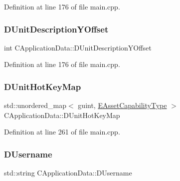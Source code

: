Definition at line 176 of file main.\+cpp.

\hypertarget{classCApplicationData_a6c60b2da482699f1d998acfe24fec332}{}\label{classCApplicationData_a6c60b2da482699f1d998acfe24fec332} 
\subsubsection{\texorpdfstring{D\+Unit\+Description\+Y\+Offset}{DUnitDescriptionYOffset}}
{\footnotesize\ttfamily int C\+Application\+Data\+::\+D\+Unit\+Description\+Y\+Offset\hspace{0.3cm}{\ttfamily [protected]}}



Definition at line 176 of file main.\+cpp.

\hypertarget{classCApplicationData_ae0c7b5849264d7234ffb160d54650f9a}{}\label{classCApplicationData_ae0c7b5849264d7234ffb160d54650f9a} 
\subsubsection{\texorpdfstring{D\+Unit\+Hot\+Key\+Map}{DUnitHotKeyMap}}
{\footnotesize\ttfamily std\+::unordered\+\_\+map$<$ guint, \hyperlink{GameDataTypes_8h_a35b98ce26aca678b03c6f9f76e4778ce}{E\+Asset\+Capability\+Type} $>$ C\+Application\+Data\+::\+D\+Unit\+Hot\+Key\+Map\hspace{0.3cm}{\ttfamily [protected]}}



Definition at line 261 of file main.\+cpp.

\hypertarget{classCApplicationData_aedfdb512317e5b62d0bbbcddcd48dfb8}{}\label{classCApplicationData_aedfdb512317e5b62d0bbbcddcd48dfb8} 
\subsubsection{\texorpdfstring{D\+Username}{DUsername}}
{\footnotesize\ttfamily std\+::string C\+Application\+Data\+::\+D\+Username\hspace{0.3cm}{\ttfamily [protected]}}



